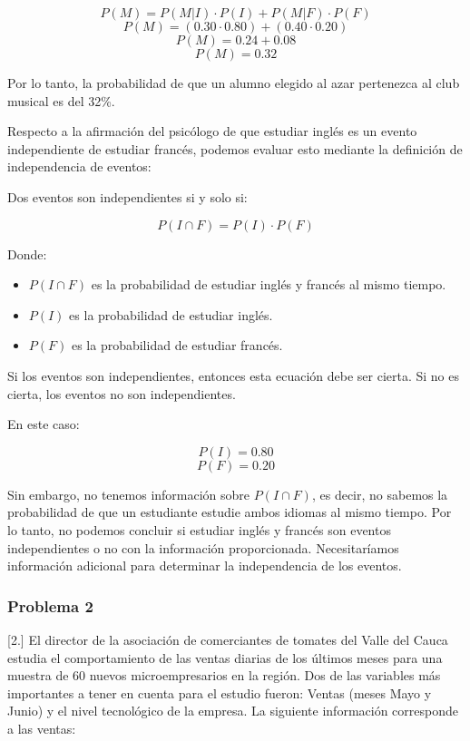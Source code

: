 \documentclass[
]{article}
\providecommand{\tightlist}{%
  \setlength{\itemsep}{0pt}\setlength{\parskip}{0pt}}
\begin{document}
\[P(M) = P(M|I) \cdot P(I) + P(M|F) \cdot P(F)\]
\[P(M) = (0.30 \cdot 0.80) + (0.40 \cdot 0.20)\] \[P(M) = 0.24 + 0.08\]
\[P(M) = 0.32\]

Por lo tanto, la probabilidad de que un alumno elegido al azar
pertenezca al club musical es del 32\%.

Respecto a la afirmación del psicólogo de que estudiar inglés es un
evento independiente de estudiar francés, podemos evaluar esto mediante
la definición de independencia de eventos:

Dos eventos son independientes si y solo si:

\[P(I ∩ F) = P(I) \cdot P(F)\]

Donde:

\begin{itemize}
\tightlist
\item
  \(P(I ∩ F)\) es la probabilidad de estudiar inglés y francés al mismo
  tiempo.
\item
  \(P(I)\) es la probabilidad de estudiar inglés.
\item
  \(P(F)\) es la probabilidad de estudiar francés.
\end{itemize}

Si los eventos son independientes, entonces esta ecuación debe ser
cierta. Si no es cierta, los eventos no son independientes.

En este caso:

\[P(I) = 0.80\] \[P(F) = 0.20\]

Sin embargo, no tenemos información sobre \(P(I ∩ F)\), es decir, no
sabemos la probabilidad de que un estudiante estudie ambos idiomas al
mismo tiempo. Por lo tanto, no podemos concluir si estudiar inglés y
francés son eventos independientes o no con la información
proporcionada. Necesitaríamos información adicional para determinar la
independencia de los eventos.

\hypertarget{problema-2-1}{%
\subsubsection{Problema 2}\label{problema-2-1}}

{[}2.{]} El director de la asociación de comerciantes de tomates del
Valle del Cauca estudia el comportamiento de las ventas diarias de los
últimos meses para una muestra de 60 nuevos microempresarios en la
región. Dos de las variables más importantes a tener en cuenta para el
estudio fueron: Ventas (meses Mayo y Junio) y el nivel tecnológico de la
empresa. La siguiente información corresponde a las ventas:
\end{document}
